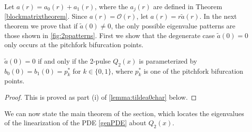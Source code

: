 \documentclass[thesis.tex]{subfiles}
\begin{document}
Let $a(r) = a_0(r) + a_1(r)$, where the $a_j(r)$ are defined in Theorem \ref{blockmatrixtheorem}. Since $a(r) = \mathcal{O}(r)$, let $a(r) = r \tilde{a}(r)$. In the next theorem we prove that if $\tilde{a}(0) \neq 0$, the only possible eigenvalue patterns are those shown in \cref{fig:2ppatterns}. First we show that the degenerate case $\tilde{a}(0) = 0$ only occurs at the pitchfork bifurcation points.

\begin{lemma}
$\tilde{a}(0) = 0$ if and only if the 2-pulse $Q_2(x)$ is parameterized by $b_0(0) = b_1(0) = p_k^*$ for $k \in \{0, 1\}$, where $p_k^*$ is one of the pitchfork bifurcation points.
\begin{proof}
This is proved as part (i) of \cref{lemma:tildea0char} below.
\end{proof}
\end{lemma}

We can now state the main theorem of the section, which locates the eigenvalues of the linearization of the PDE \cref{genPDE} about $Q_2(x)$.
\end{document}
